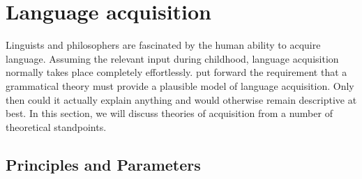 \chapter{Language acquisition}
\label{chap-acquisition}

Linguists and philosophers are fascinated by the human ability to acquire language. Assuming the relevant input during childhood,
language acquisition normally takes place completely effortlessly.
\citet[--25]{Chomsky65a} put forward the requirement that a grammatical theory must provide a plausible model of language acquisition.
Only then could it actually explain anything and would otherwise remain descriptive at best. In this section, we will discuss
theories of acquisition from a number of theoretical standpoints.


\section{Principles and Parameters}
\label{Abschnitt-PP}\label{sec-pro-drop}

